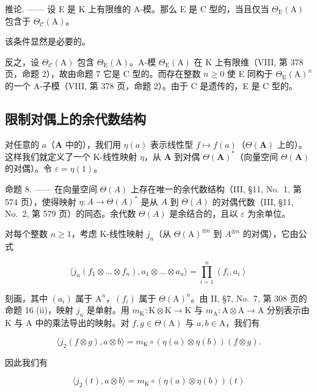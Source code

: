 推论. —— 设 E 是 K 上有限维的 A-模。那么 E 是 C 型的，当且仅当 \(\Theta_{\mathrm{E}}(\mathrm{A})\) 包含于 \(\Theta_{\mathcal{C}}(\mathrm{A})\)。

该条件显然是必要的。

反之，设 \(\Theta_{\mathcal{C}}(\mathrm{A})\) 包含 \(\Theta_{\mathrm{E}}(\mathrm{A})\)。A-模 \(\Theta_{\mathrm{E}}(\mathrm{A})\) 在 K 上有限维（VIII, 第 378 页，命题 2），故由命题 7 它是 C 型的。而存在整数 \(n \geqslant 0\) 使 E 同构于 \(\Theta_{\mathrm{E}}(\mathrm{A})^{n}\) 的一个 A-子模（VIII, 第 378 页，命题 2）。由于 C 是遗传的，E 是 C 型的。

\subsection{限制对偶上的余代数结构}

对任意的 \(a\)（\(\mathbf{A}\) 中的），我们用 \(\eta(a)\) 表示线性型 \(f \mapsto f(a)\)（\(\Theta(\mathbf{A})\) 上的）。这样我们就定义了一个 K-线性映射 \(\eta\)，从 \(\mathbf{A}\) 到对偶 \(\Theta(\mathbf{A})^*\)（向量空间 \(\Theta(\mathbf{A})\) 的对偶）。令 \(\varepsilon = \eta(1)\)。

命题 8. —— 在向量空间 \(\Theta(A)\) 上存在唯一的余代数结构（III, §11, No.~1, 第 574 页），使得映射 \(\eta: A \to \Theta(A)^*\) 是从 \(A\) 到 \(\Theta(A)\) 的对偶代数（III, §11, No.~2, 第 579 页）的同态。余代数 \(\Theta(A)\) 是余结合的，且以 \(\varepsilon\) 为余单位。

对每个整数 \(n \geqslant 1\)，考虑 K-线性映射 \(j_{n}\)（从 \(\Theta(\mathrm{A})^{\otimes n}\) 到 \(A^{\otimes n}\) 的对偶），它由公式

\[
\langle j _ {n} \left(f _ {1} \otimes \dots \otimes f _ {n}\right), a _ {1} \otimes \dots \otimes a _ {n} \rangle = \prod_ {i = 1} ^ {n} \left\langle f _ {i}, a _ {i} \right\rangle\tag{13}
\]

刻画，其中 \((a_{i})\) 属于 \(\mathrm{A}^n\)，\((f_i)\) 属于 \(\Theta (\mathrm{A})^n\)。由 II, §7, No.~7, 第 308 页的命题 16 (ii)，映射 \(j_{n}\) 是单射。用 \(m_{\mathrm{K}}:\mathrm{K}\otimes \mathrm{K}\to \mathrm{K}\) 与 \(m_{\mathrm{A}}:\mathrm{A}\otimes \mathrm{A}\rightarrow \mathrm{A}\) 分别表示由 K 与 A 中的乘法导出的映射。对 \(f,g\in \Theta (\mathrm{A})\) 与 \(a,b\in \mathrm{A}\)，我们有

\[
\langle j _ {2} (f \otimes g), a \otimes b \rangle = m _ {\mathrm{K}} \circ (\eta (a) \otimes \eta (b)) (f \otimes g).
\]

因此我们有

\[
\langle j _ {2} (t), a \otimes b \rangle = m _ {\mathrm{K}} \circ (\eta (a) \otimes \eta (b)) (t)\tag{14}
\]

